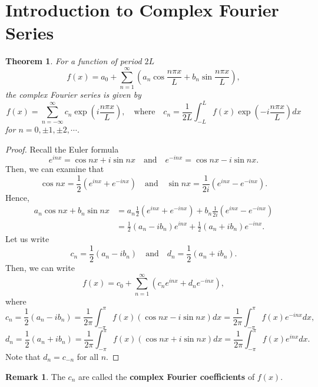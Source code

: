 \documentclass[12pt,openany]{book}
\newtheorem{theorem}{Theorem}[chapter]
\theoremstyle{definition}
\newtheorem{remark}{Remark}[chapter]
\begin{document}
	\section{Introduction to Complex Fourier Series}
	\begin{tcolorbox}[colframe=thmcolor, title={\color{white}\bf Complex Fourier Series}]
		\begin{theorem}
			For a function of period \(2L\)
			\[
			f(x) = a_0 + \sum_{n=1}^{\infty} \left( a_n \cos \frac{n\pi x}{L} + b_n \sin \frac{n\pi x}{L} \right),
			\]
			the complex Fourier series is given by
			\[
			f(x) = \sum_{n=-\infty}^{\infty} c_n \exp \left( i\frac{n\pi x}{L} \right),\quad
			\text{where}\quad
			c_n = \frac{1}{2L} \int_{-L}^{L} f(x) \exp \left( -i\frac{n\pi x}{L} \right) dx
			\]
			for \( n = 0, \pm1, \pm2, \cdots \).
		\end{theorem}
	\end{tcolorbox}
	\begin{proof}
		Recall the Euler formula
		\[
		e^{inx} = \cos nx + i \sin nx \quad \text{and} \quad e^{-inx} = \cos nx - i \sin nx.
		\] Then, we can examine that
		\[
		\cos nx = \frac{1}{2} \left( e^{inx} + e^{-inx} \right) \quad \text{and} \quad \sin nx = \frac{1}{2i} \left( e^{inx} - e^{-inx} \right).
		\] Hence,
		\begin{align*}
			a_n \cos nx + b_n \sin nx &= a_n \frac{1}{2} \left( e^{inx} + e^{-inx} \right) + b_n \frac{1}{2i} \left( e^{inx} - e^{-inx} \right) \\
			&= \frac{1}{2} (a_n - ib_n)e^{inx} + \frac{1}{2} (a_n + ib_n)e^{-inx}.
		\end{align*}
		Let us write
		\[
		c_n = \frac{1}{2}(a_n - ib_n) \quad \text{and} \quad d_n = \frac{1}{2}(a_n + ib_n).
		\] Then, we can write
		\[
		f(x) = c_0 + \sum_{n=1}^{\infty} \left( c_n e^{inx} + d_n e^{-inx} \right),
		\]
		where
		\[
		c_n = \frac{1}{2} (a_n - ib_n) = \frac{1}{2\pi} \int_{-\pi}^{\pi} f(x) \left( \cos nx - i \sin nx \right) dx = \frac{1}{2\pi} \int_{-\pi}^{\pi} f(x)e^{-inx} dx,
		\]
		\[
		d_n = \frac{1}{2} (a_n + ib_n) = \frac{1}{2\pi} \int_{-\pi}^{\pi} f(x) \left( \cos nx + i \sin nx \right) dx = \frac{1}{2\pi} \int_{-\pi}^{\pi} f(x)e^{inx} dx.
		\] Note that \( d_n = c_{-n} \) for all \( n \).
	\end{proof}
	\vspace{12pt}
	\begin{remark}
		The \( c_n \) are called the \textbf{complex Fourier coefficients} of \( f(x) \).
	\end{remark}
	
\end{document}
